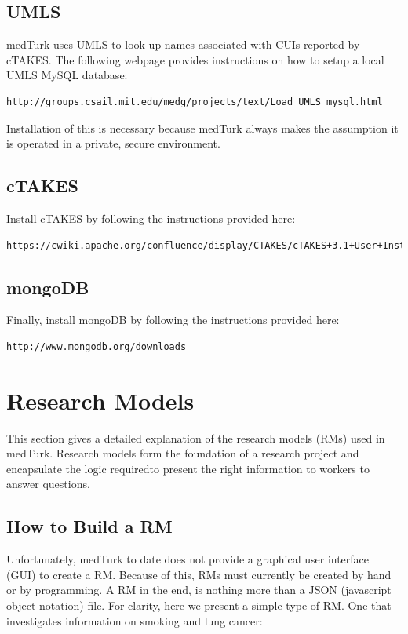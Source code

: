 \documentclass{book}
\begin{document}
\section{UMLS}
medTurk uses UMLS to look up names associated with CUIs reported by cTAKES. The following webpage provides instructions on how to setup a local UMLS MySQL database:

\begin{verbatim}
http://groups.csail.mit.edu/medg/projects/text/Load_UMLS_mysql.html
\end{verbatim}

Installation of this is necessary because medTurk always makes the assumption it is operated in a private, secure environment.

\section{cTAKES}
Install cTAKES by following the instructions provided here:

\begin{verbatim}
https://cwiki.apache.org/confluence/display/CTAKES/cTAKES+3.1+User+Install+Guide
\end{verbatim}





\section{mongoDB}
Finally, install mongoDB by following the instructions provided here:

\begin{verbatim}
http://www.mongodb.org/downloads
\end{verbatim}



\chapter{Research Models}
This section gives a detailed explanation of the research models (RMs) used in medTurk. Research models form the foundation of a research project and encapsulate the logic requiredto present the right information to workers to answer questions.

\section{How to Build a RM}
Unfortunately, medTurk to date does not provide a graphical user interface (GUI) to create a RM. Because of this, RMs must currently be created by hand or by programming. A RM in the end, is nothing more than a JSON (javascript object notation) file. For clarity, here we present a simple type of RM. One that investigates information on smoking and lung cancer:
\end{document}
